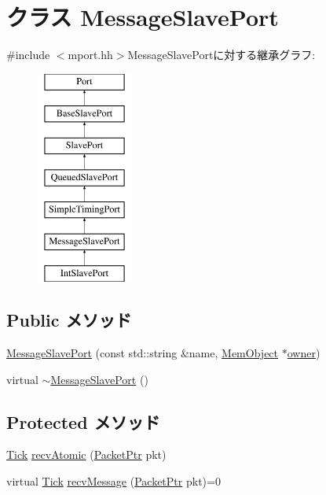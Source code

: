 \hypertarget{classMessageSlavePort}{
\section{クラス MessageSlavePort}
\label{classMessageSlavePort}
}


{\ttfamily \#include $<$mport.hh$>$}MessageSlavePortに対する継承グラフ:\begin{figure}[H]
\begin{center}
\leavevmode
\includegraphics[height=7cm]{classMessageSlavePort}
\end{center}
\end{figure}
\subsection*{Public メソッド}
\begin{DoxyCompactItemize}
\item 
\hyperlink{classMessageSlavePort_a685648e7373952f0d35b2570275649cd}{MessageSlavePort} (const std::string \&name, \hyperlink{classMemObject}{MemObject} $\ast$\hyperlink{classPort_aba966efb6c1df4b015be3a396df6c318}{owner})
\item 
virtual \hyperlink{classMessageSlavePort_ac49d794fcd3b28b1e40ec26c996ae8fc}{$\sim$MessageSlavePort} ()
\end{DoxyCompactItemize}
\subsection*{Protected メソッド}
\begin{DoxyCompactItemize}
\item 
\hyperlink{base_2types_8hh_a5c8ed81b7d238c9083e1037ba6d61643}{Tick} \hyperlink{classMessageSlavePort_a5f0b4c4a94f6b0053f9d7a4eb9c2518a}{recvAtomic} (\hyperlink{classPacket}{PacketPtr} pkt)
\item 
virtual \hyperlink{base_2types_8hh_a5c8ed81b7d238c9083e1037ba6d61643}{Tick} \hyperlink{classMessageSlavePort_aa3b469f80ff640585c37fae6064062a3}{recvMessage} (\hyperlink{classPacket}{PacketPtr} pkt)=0
\end{DoxyCompactItemize}


